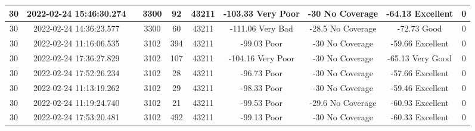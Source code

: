 \begin{longtable*}{|c|c|c|c|c|c|c|c|c|c|}
30&2022-02-24 15:46:30.274&&3300&92&43211& -103.33   Very Poor   & -30       No Coverage & -64.13    Excellent   & 0\\\hline
{}30&2022-02-24 14:36:23.577&&3300&60&43211& -111.06   Very Bad    & -28.5     No Coverage & -72.73    Good        & 0\\\hline
{}30&2022-02-24 11:16:06.535&&3102&394&43211& -99.03    Poor        & -30       No Coverage & -59.66    Excellent   & 0\\\hline
{}30&2022-02-24 17:36:27.829&&3102&107&43211& -104.16   Very Poor   & -30       No Coverage & -65.13    Very Good   & 0\\\hline
{}30&2022-02-24 17:52:26.234&&3102&28&43211& -96.73    Poor        & -30       No Coverage & -57.66    Excellent   & 0\\\hline
{}30&2022-02-24 11:13:19.262&&3102&29&43211& -98.33    Poor        & -30       No Coverage & -59.46    Excellent   & 0\\\hline
{}30&2022-02-24 11:19:24.740&&3102&21&43211& -99.53    Poor        & -29.6     No Coverage & -60.93    Excellent   & 0\\\hline
{}30&2022-02-24 17:53:20.481&&3102&492&43211& -99.13    Poor        & -30       No Coverage & -60.33    Excellent   & 0\\\hline

\end{longtable*}
